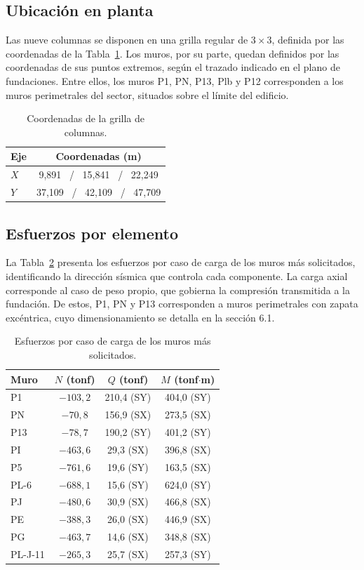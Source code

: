 \subsection{Ubicación en planta}
Las nueve columnas se disponen en una grilla regular de $3 \times 3$, definida por las coordenadas de la Tabla~\ref{tab:grilla_columnas}. Los muros, por su parte, quedan definidos por las coordenadas de sus puntos extremos, según el trazado indicado en el plano de fundaciones. Entre ellos, los muros P1, PN, P13, Plb y P12 corresponden a los muros perimetrales del sector, situados sobre el límite del edificio.

\begin{table}[H]
\centering
\caption{Coordenadas de la grilla de columnas.}
\label{tab:grilla_columnas}
\begin{tabular}{lc}
\hline
Eje & Coordenadas (m) \\
\hline
$X$ & 9,891 \, / \, 15,841 \, / \, 22,249 \\
$Y$ & 37,109 \, / \, 42,109 \, / \, 47,709 \\
\hline
\end{tabular}
\end{table}

\subsection{Esfuerzos por elemento}
La Tabla~\ref{tab:esf_muros} presenta los esfuerzos por caso de carga de los muros más solicitados, identificando la dirección sísmica que controla cada componente. La carga axial corresponde al caso de peso propio, que gobierna la compresión transmitida a la fundación. De estos, P1, PN y P13 corresponden a muros perimetrales con zapata excéntrica, cuyo dimensionamiento se detalla en la sección 6.1.

\begin{table}[H]
\centering
\caption{Esfuerzos por caso de carga de los muros más solicitados.}
\label{tab:esf_muros}
\begin{tabular}{lccc}
\hline
Muro & $N$ (tonf) & $Q$ (tonf) & $M$ (tonf$\cdot$m) \\
\hline
P1   & $-103,2$ & 210,4 (SY) & 404,0 (SY) \\
PN   & $-70,8$  & 156,9 (SX) & 273,5 (SX) \\
P13  & $-78,7$  & 190,2 (SY) & 401,2 (SY) \\
PI   & $-463,6$ & 29,3 (SX)  & 396,8 (SX) \\
P5   & $-761,6$ & 19,6 (SY)  & 163,5 (SX) \\
PL-6 & $-688,1$ & 15,6 (SY)  & 624,0 (SY) \\
PJ   & $-480,6$ & 30,9 (SX)  & 466,8 (SX) \\
PE   & $-388,3$ & 26,0 (SX)  & 446,9 (SX) \\
PG   & $-463,7$ & 14,6 (SX)  & 348,8 (SX) \\
PL-J-11 & $-265,3$ & 25,7 (SX) & 257,3 (SY) \\
\hline
\end{tabular}
\end{table}

